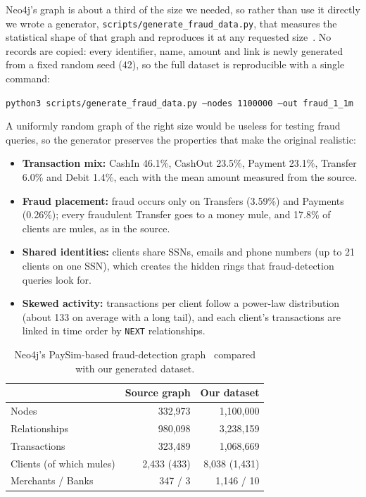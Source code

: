 Neo4j's graph is about a third of the size we needed, so rather than use it directly we wrote a generator, \texttt{scripts/generate\_fraud\_data.py}, that measures the statistical shape of that graph and reproduces it at any requested size~\cite{team6_2026repo}. No records are copied: every identifier, name, amount and link is newly generated from a fixed random seed (42), so the full dataset is reproducible with a single command:

\begin{center}
\texttt{python3 scripts/generate\_fraud\_data.py --nodes 1100000 --out fraud\_1\_1m}
\end{center}

\noindent A uniformly random graph of the right size would be useless for testing fraud queries, so the generator preserves the properties that make the original realistic:

\begin{itemize}
  \item \textbf{Transaction mix:} CashIn 46.1\%, CashOut 23.5\%, Payment 23.1\%, Transfer 6.0\% and Debit 1.4\%, each with the mean amount measured from the source.
  \item \textbf{Fraud placement:} fraud occurs only on Transfers (3.59\%) and Payments (0.26\%); every fraudulent Transfer goes to a money mule, and 17.8\% of clients are mules, as in the source.
  \item \textbf{Shared identities:} clients share SSNs, emails and phone numbers (up to 21 clients on one SSN), which creates the hidden rings that fraud-detection queries look for.
  \item \textbf{Skewed activity:} transactions per client follow a power-law distribution (about 133 on average with a long tail), and each client's transactions are linked in time order by \texttt{NEXT} relationships.
\end{itemize}

\begin{table}[htbp]
\centering
\small
\caption{Neo4j's PaySim-based fraud-detection graph~\cite{neo4j2026frauddetection} compared with our generated dataset.}\label{tab:fraudscale}
\begin{tabular}{lrr}
\toprule
 & \textbf{Source graph} & \textbf{Our dataset} \\
\midrule
Nodes & 332,973 & 1,100,000 \\
Relationships & 980,098 & 3,238,159 \\
Transactions & 323,489 & 1,068,669 \\
Clients (of which mules) & 2,433 (433) & 8,038 (1,431) \\
Merchants / Banks & 347 / 3 & 1,146 / 10 \\
\bottomrule
\end{tabular}
\end{table}

